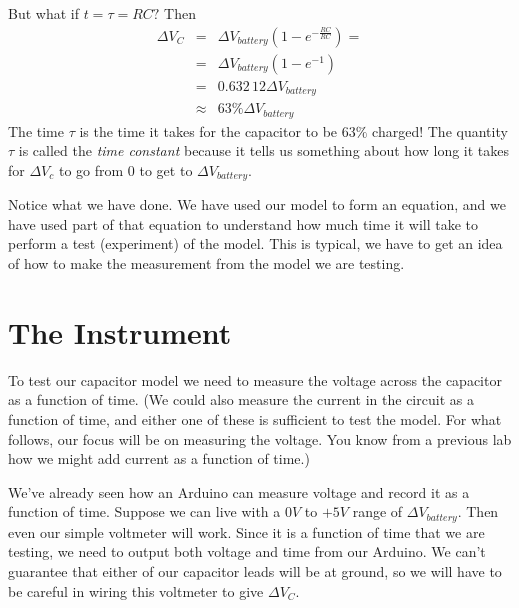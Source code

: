 But what if $t=\tau =RC?$ Then 
\begin{eqnarray*}
\Delta V_{C} &=&\Delta V_{battery}\left( 1-e^{-\frac{RC}{RC}}\right) = \\
&=&\Delta V_{battery}\left( 1-e^{-1}\right) \\
&=&\allowbreak 0.632\,12\Delta V_{battery} \\
&\approx &63\%\Delta V_{battery}
\end{eqnarray*}%
The time $\tau $ is the time it takes for the capacitor to be $63\%$ charged!
The quantity $\tau $ is called the \emph{time constant} because it tells us
something about how long it takes for $\Delta V_{c}$ to go from $0$ to get
to $\Delta V_{battery}.$ 

Notice what we have done. We have used our model to form an equation, and we
have used part of that equation to understand how much time it will take to
perform a test (experiment) of the model. This is typical, we have to get an
idea of how to make the measurement from the model we are testing.


\section{The Instrument}

To test our capacitor model we need to measure the voltage across the
capacitor as a function of time. (We could also measure the current in the
circuit as a function of time, and either one of these is 
sufficient to test the model. For what follows, our focus will be on 
measuring the voltage. You know from a previous lab how we might add current
as a function of time.)

We've already seen how an Arduino can measure voltage and record it as a
function of time.
Suppose we can live with a $0\unit{V}$ to $+5\unit{V}$ range of 
$\Delta V_{battery}.$ Then even our simple voltmeter will work. Since it is
a function of time that we are testing, we need to output both voltage and
time from our Arduino. We can't guarantee that either of our capacitor leads
will be at ground, so we will have to be careful in wiring this voltmeter to
give $\Delta V_{C}.$

